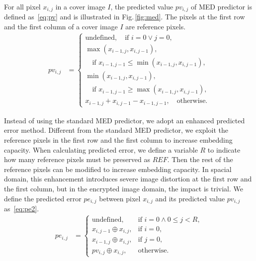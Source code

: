 \documentclass{elsarticle}
\begin{document}
	
	For all pixel \(x_{i, j}\) in a cover image \(I\), the predicted value \(pv_{i, j}\) of MED predictor is defined as~\eqref{eq:pv} and is illustrated in Fig.\,\ref{fig:med}. 
	The pixels at the first row and the first column of a cover image \(I\) are reference pixels.
%	
	\begin{align}
		\label{eq:pv}
		pv_{i, j} & = 
		\begin{cases}
			\text{undefined}							   , \quad \text{if } i = 0 \vee j = 0, \\
			\max(x_{i - 1, j}, x_{i, j - 1})               , \\
			\quad \text{if } x_{i - 1, j - 1} \leq \min(x_{i - 1, j}, x_{i, j - 1}), \\
			\min(x_{i - 1, j}, x_{i, j - 1})               , \\
			\quad \text{if } x_{i - 1, j - 1} \geq \max(x_{i - 1, j}, x_{i, j - 1}), \\
			x_{i - 1, j} + x_{i, j - 1} - x_{i - 1, j - 1} , \quad \text{otherwise}. 
		\end{cases}  	
	\end{align}
	
	Instead of using the standard MED predictor, we adopt an enhanced predicted error method. 
	Different from the standard MED predictor, we exploit the reference pixels in the first row and the first column to increase embedding capacity.
	When calculating predicted error, we define a variable \(R\) to indicate how many reference pixels must be preserved as \(REF\).
	Then the rest of the reference pixels can be modified to increase embedding capacity.
	In spacial domain, this enhancement introduces severe image distortion at the first row and the first column, but in the encrypted image domain, the impact is trivial.
	We define the predicted error \(pe_{i, j}\) between pixel \(x_{i, j}\) and its predicted value \(pv_{i, j}\) as~\eqref{eq:pe2}.
%	
	\begin{align}
		\label{eq:pe2}
		pe_{i, j} &= 
		\begin{cases}
			\text{undefined},             & \text{if } i = 0 \wedge  0 \leq j < R ,\\
			x_{i, j - 1} \oplus x_{i, j}, & \text{if } i = 0 ,\\
			x_{i - 1, j} \oplus x_{i, j}, & \text{if } j = 0 ,\\
			pv_{i, j} \oplus x_{i, j}, 	  & \text{otherwise}.
		\end{cases} 
	\end{align}
	
\end{document}
